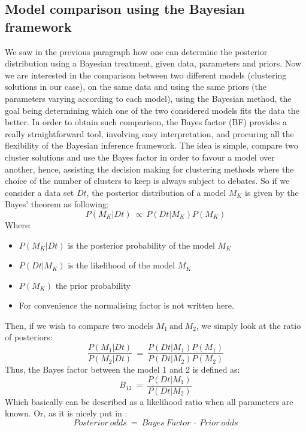 \documentclass[twocolumn,12pt]{article}
\begin{document}
\subsection{Model comparison using the Bayesian framework}

We saw in the previous paragraph how one can determine the posterior distribution using a Bayesian treatment, given data, parameters and priors.
Now we are interested in the comparison between two different models (clustering solutions in our case), on the same data and using the same priors (the parameters varying according to each model), using the Bayesian method, the goal being determining which one of the two considered models fits the data the better.
In order to obtain such comparison, the Bayes factor (BF) provides a really straightforward tool\cite{raftery}, involving easy interpretation, and procuring all the flexibility of the Bayesian inference framework.
The idea is simple, compare two cluster solutions and use the Bayes factor in order to favour a model over another, hence, assisting the decision making for clustering methods where the choice of the number of clusters to keep is always subject to debates.
So if we consider a data set $Dt$, the posterior distribution of a model $M_K$ is given by the Bayes' theorem as following:
\begin{equation}
    P(M_K|Dt)\ \propto\ P(Dt|M_K)P(M_K) 
\end{equation}
Where:
\begin{itemize}
    \item $P(M_K|Dt)$ is the posterior probability of the model $M_K$
    \item $P(Dt|M_K)$ is the likelihood of the model $M_K$
    \item $P(M_K)$ the prior probability
    \item For convenience the normalising factor is not written here.
\end{itemize}
Then, if we wish to compare two models $M_1\ \text{and}\ M_2$, we simply look at the ratio of posteriors:
\begin{equation}
    \frac{P(M_1|Dt)}{P(M_2|Dt)}\ =\ \frac{P(Dt|M_1)P(M_1)}{P(Dt|M_2)P(M_2)}
    \label{equ:BayesRatio}
\end{equation}
Thus, the Bayes factor between the model 1 and 2 is defined as:
\begin{equation}
    B_{12}\ =\ \frac{P(Dt|M_1)}{P(Dt|M_2)}
\end{equation}
Which basically can be described as a likelihood ratio when all parameters are known.
Or, as it is nicely put in \cite{raftery}:\\
$$Posterior\ odds\ =\ Bayes\ Factor\ \cdot\ Prior\ odds$$
\end{document}
